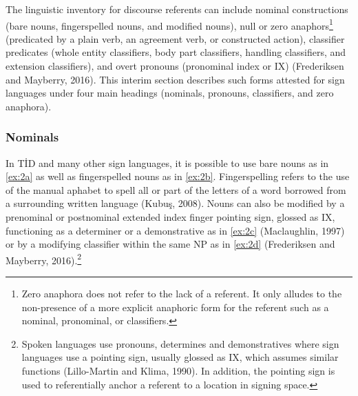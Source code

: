 \documentclass[]{elsarticle} %
\begin{document}
The linguistic inventory for discourse referents can include nominal
constructions (bare nouns, fingerspelled nouns, and modified nouns),
null or zero
anaphors\footnote{Zero anaphora does not refer to the lack of a referent. It only alludes to the non-presence of a more explicit anaphoric form for the referent such as a nominal, pronominal, or classifiers.}
(predicated by a plain verb, an agreement verb, or constructed action),
classifier predicates (whole entity classifiers, body part classifiers,
handling classifiers, and extension classifiers), and overt pronouns
(pronominal index or IX) (Frederiksen and Mayberry, 2016). This interim
section describes such forms attested for sign languages under four main
headings (nominals, pronouns, classifiers, and zero anaphora).

\hypertarget{nominals}{%
\subsubsection{Nominals}\label{nominals}}

In TİD and many other sign languages, it is possible to use bare nouns
as in \ref{ex:2a} as well as fingerspelled nouns as in \ref{ex:2b}.
Fingerspelling refers to the use of the manual aphabet to spell all or
part of the letters of a word borrowed from a surrounding written
language (Kubuş, 2008). Nouns can also be modified by a prenominal or
postnominal extended index finger pointing sign, glossed as IX,
functioning as a determiner or a demonstrative as in \ref{ex:2c}
(Maclaughlin, 1997) or by a modifying classifier within the same NP as
in \ref{ex:2d} (Frederiksen and Mayberry,
2016).\footnote{Spoken languages use pronouns, determines and demonstratives where sign languages use a pointing sign, usually glossed as IX, which assumes similar functions (Lillo-Martin and Klima, 1990). In addition, the pointing sign is used to referentially anchor a referent to a location in signing space.}
\end{document}
